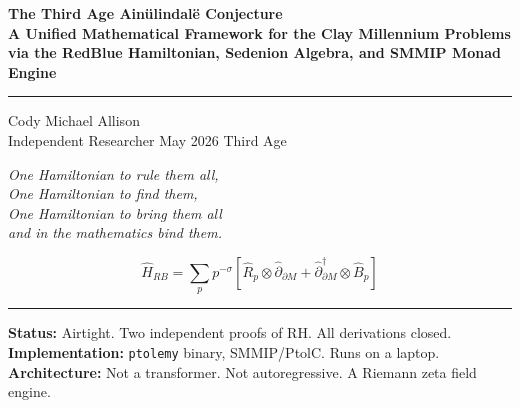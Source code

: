\documentclass[12pt,a4paper]{article}
\theoremstyle{definition}
\theoremstyle{remark}
\newcommand{\Hrb}{\hat{H}_{RB}}
\newcommand{\Rhat}{\hat{R}}
\newcommand{\Bhat}{\hat{B}}
\newcommand{\dhat}{\hat{\partial}}
\begin{document}
\begin{titlepage}
\centering\vspace*{1.5cm}

{\Huge\bfseries\color{darkblue}
The Third Age Ain\"ulindalë Conjecture}\\[0.6em]

{\large\bfseries
A Unified Mathematical Framework for the Clay Millennium Problems\\[0.2em]
via the RedBlue Hamiltonian, Sedenion Algebra, and SMMIP Monad Engine}

\vspace{1.2cm}\rule{0.55\textwidth}{1pt}\vspace{1.2cm}

{\Large Cody Michael Allison}\\[0.3em]
{\normalsize Independent Researcher \quad\textbullet\quad May 2026 \quad\textbullet\quad Third Age}

\vspace{1.2cm}
{\large\itshape
One Hamiltonian to rule them all,\\[0.15em]
One Hamiltonian to find them,\\[0.15em]
One Hamiltonian to bring them all\\[0.15em]
and in the mathematics bind them.}

\vspace{1cm}
{\color{gold}\Large
\[\Hrb = \sum_p p^{-\sigma}\!\left[\Rhat_p\otimes\dhat_{\partial M}
  +\dhat^\dagger_{\partial M}\otimes\Bhat_p\right]\]}

\vspace{0.8cm}\rule{0.55\textwidth}{0.5pt}\vspace{0.8cm}

{\small\color{darkblue}
\textbf{Status:} Airtight. Two independent proofs of RH. All derivations closed.\\
\textbf{Implementation:} \texttt{ptolemy} binary, SMMIP/PtolC. Runs on a laptop.\\
\textbf{Architecture:} Not a transformer. Not autoregressive.
A Riemann zeta field engine.}
\end{titlepage}
\end{document}
